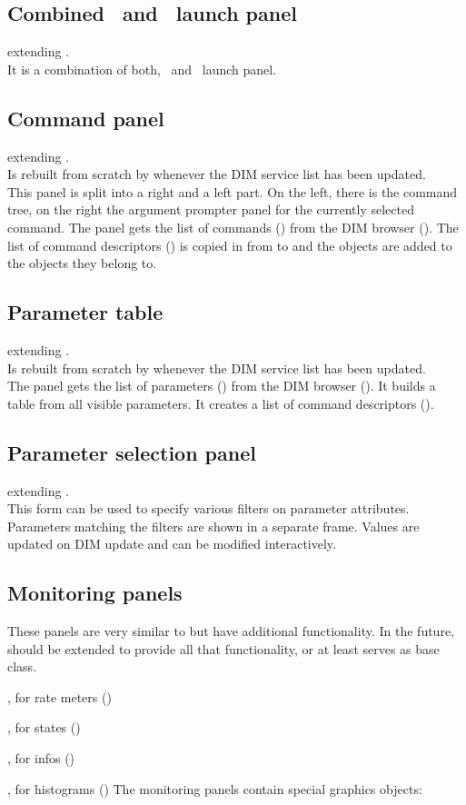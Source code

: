 \subsection{Combined \dabc\ and \mbs\ launch panel}
 extending .\\
It is a combination of both, \dabc\ and \mbs\ launch panel.
\subsection{Command panel}
 extending .\\
Is rebuilt from scratch by  whenever the DIM service list has been updated.\\
This panel is split into a right and a left part. On the left, there is the command tree,
on the right the argument prompter panel for the currently selected command.
The panel gets the list of commands () from the DIM browser ().
The list of command descriptors () is copied in  from  to
 and the  objects are added to the
 objects they belong to.
\subsection{Parameter table}
 extending .\\
Is rebuilt from scratch by  whenever the DIM service list has been updated.\\
The panel gets the list of parameters () from the DIM browser (). It builds a table from all visible parameters.
It creates a list of command descriptors ().
\subsection{Parameter selection panel}
 extending .\\
This form can be used to specify various filters on parameter attributes.
Parameters matching the filters are shown in a separate frame. Values
are updated on DIM update and can be modified interactively.
\subsection{Monitoring panels}
These panels are very similar to  but have additional
functionality. 
 In the future,  should be extended to provide all that functionality, or at least serves as base class.
\bdes
\item [\class{xPanelMeter}:]  , for rate meters ()
\item [\class{xPanelState}:]  , for states ()
\item [\class{xPanelInfo}:]   , for infos ()
\item [\class{xPanelHisto}:]  , for histograms ()
\edes
The monitoring panels contain special graphics objects:
